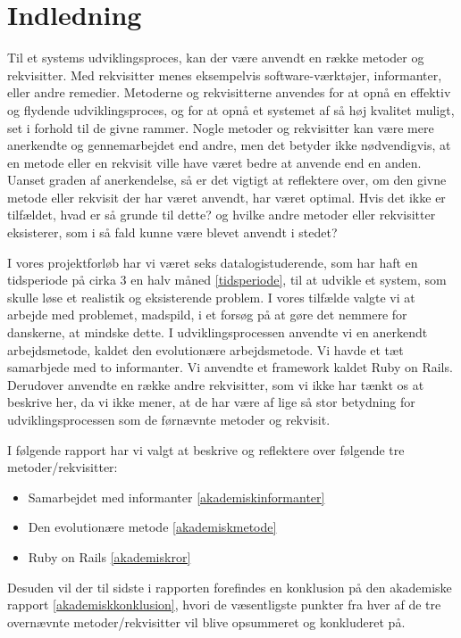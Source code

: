 \chapter{Indledning}

Til et systems udviklingsproces, kan der være anvendt en række metoder og rekvisitter. Med rekvisitter menes eksempelvis software-værktøjer, informanter, eller andre remedier. Metoderne og rekvisitterne anvendes for at opnå en effektiv og flydende udviklingsproces, og for at opnå et systemet af så høj kvalitet muligt, set i forhold til de givne rammer. Nogle metoder og rekvisitter kan være mere anerkendte og gennemarbejdet end andre, men det betyder ikke nødvendigvis, at en metode eller en rekvisit ville have været bedre at anvende end en anden. Uanset graden af anerkendelse, så er det vigtigt at reflektere over, om den givne metode eller rekvisit der har været anvendt, har været optimal. Hvis det ikke er tilfældet, hvad er så grunde til dette? og hvilke andre metoder eller rekvisitter eksisterer, som i så fald kunne være blevet anvendt i stedet?

I vores projektforløb har vi været seks datalogistuderende, som har haft en tidsperiode på cirka 3 en halv måned \ref{tidsperiode}, til at udvikle et system, som skulle løse et realistik og eksisterende problem. I vores tilfælde valgte vi at arbejde med problemet, madspild, i et forsøg på at gøre det nemmere for danskerne, at mindske dette. I udviklingsprocessen anvendte vi en anerkendt arbejdsmetode, kaldet den evolutionære arbejdsmetode. Vi havde et tæt samarbjede med to informanter. Vi anvendte et framework kaldet Ruby on Rails. Derudover anvendte en række andre rekvisitter, som vi ikke har tænkt os at beskrive her, da vi ikke mener, at de har være af lige så stor betydning for udviklingsprocessen som de førnævnte metoder og rekvisit.

I følgende rapport har vi valgt at beskrive og reflektere over følgende tre metoder/rekvisitter:

\begin{itemize}[noitemsep]
  \item Samarbejdet med informanter \ref{akademiskinformanter}
  \item Den evolutionære metode \ref{akademiskmetode}
  \item Ruby on Rails \ref{akademiskror}
\end{itemize}

Desuden vil der til sidste i rapporten forefindes en konklusion på den akademiske rapport \ref{akademiskkonklusion}, hvori de væsentligste punkter fra hver af de tre overnævnte metoder/rekvisitter vil blive opsummeret og konkluderet på.




